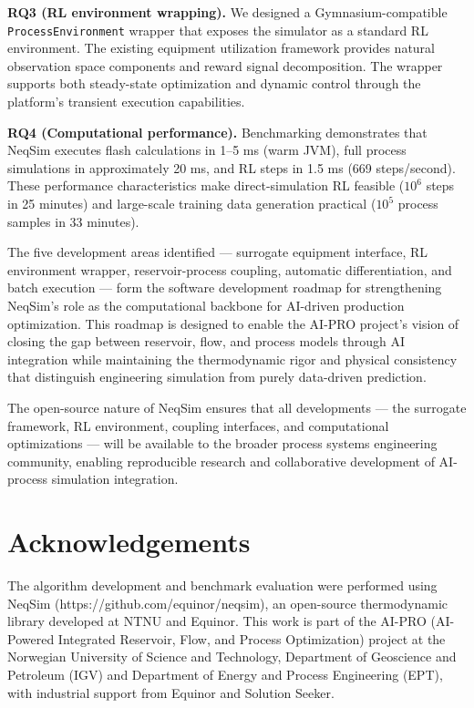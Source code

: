 \documentclass[review,3p]{custom}
\begin{document}
\textbf{RQ3 (RL environment wrapping).} We designed a Gymnasium-compatible \texttt{ProcessEnvironment} wrapper that exposes the simulator as a standard RL environment. The existing equipment utilization framework provides natural observation space components and reward signal decomposition. The wrapper supports both steady-state optimization and dynamic control through the platform's transient execution capabilities.

\textbf{RQ4 (Computational performance).} Benchmarking demonstrates that NeqSim executes flash calculations in 1--5 ms (warm JVM), full process simulations in approximately 20 ms, and RL steps in 1.5 ms (669 steps/second). These performance characteristics make direct-simulation RL feasible ($10^6$ steps in 25 minutes) and large-scale training data generation practical ($10^5$ process samples in 33 minutes).

The five development areas identified --- surrogate equipment interface, RL environment wrapper, reservoir-process coupling, automatic differentiation, and batch execution --- form the software development roadmap for strengthening NeqSim's role as the computational backbone for AI-driven production optimization. This roadmap is designed to enable the AI-PRO project's vision of closing the gap between reservoir, flow, and process models through AI integration while maintaining the thermodynamic rigor and physical consistency that distinguish engineering simulation from purely data-driven prediction.

The open-source nature of NeqSim ensures that all developments --- the surrogate framework, RL environment, coupling interfaces, and computational optimizations --- will be available to the broader process systems engineering community, enabling reproducible research and collaborative development of AI-process simulation integration.


\section{Acknowledgements}

The algorithm development and benchmark evaluation were performed using NeqSim (https://github.com/equinor/neqsim), an open-source thermodynamic library developed at NTNU and Equinor. This work is part of the AI-PRO (AI-Powered Integrated Reservoir, Flow, and Process Optimization) project at the Norwegian University of Science and Technology, Department of Geoscience and Petroleum (IGV) and Department of Energy and Process Engineering (EPT), with industrial support from Equinor and Solution Seeker.
\end{document}
